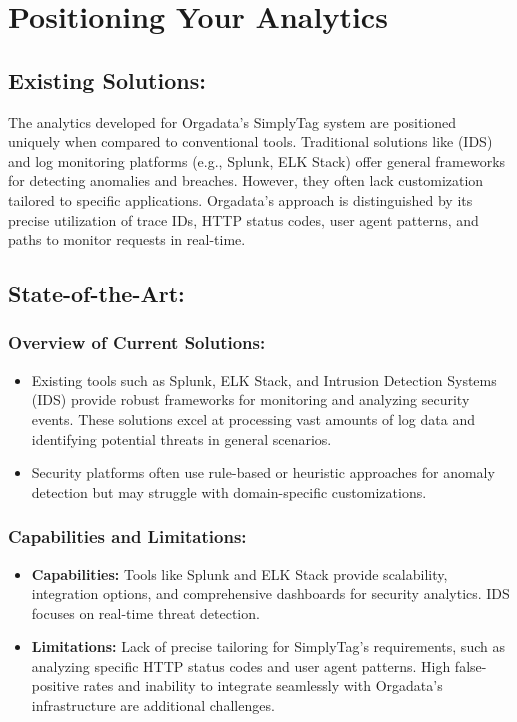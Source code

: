 %
%

\chapter{Positioning Your Analytics}

\section{Existing Solutions:}

The analytics developed for Orgadata’s SimplyTag system are positioned uniquely when compared to conventional tools. Traditional solutions like  (IDS) and log monitoring platforms (e.g., Splunk, ELK Stack) offer general frameworks for detecting anomalies and breaches. However, they often lack customization tailored to specific applications. Orgadata’s approach is distinguished by its precise utilization of trace IDs, HTTP status codes, user agent patterns, and paths to monitor requests in real-time.

\section{State-of-the-Art:}

\subsection{Overview of Current Solutions:}
\begin{itemize}
	\item Existing tools such as Splunk, ELK Stack, and Intrusion Detection Systems (IDS) provide robust frameworks for monitoring and analyzing security events. These solutions excel at processing vast amounts of log data and identifying potential threats in general scenarios.
	\item Security platforms often use rule-based or heuristic approaches for anomaly detection but may struggle with domain-specific customizations.
\end{itemize}

\subsection{Capabilities and Limitations:}
\begin{itemize}
	\item \textbf{Capabilities:} Tools like Splunk and ELK Stack provide scalability, integration options, and comprehensive dashboards for security analytics. IDS focuses on real-time threat detection.
	\item \textbf{Limitations:}  Lack of precise tailoring for SimplyTag’s requirements, such as analyzing specific HTTP status codes and user agent patterns. High false-positive rates and inability to integrate seamlessly with Orgadata’s infrastructure are additional challenges.
\end{itemize}

